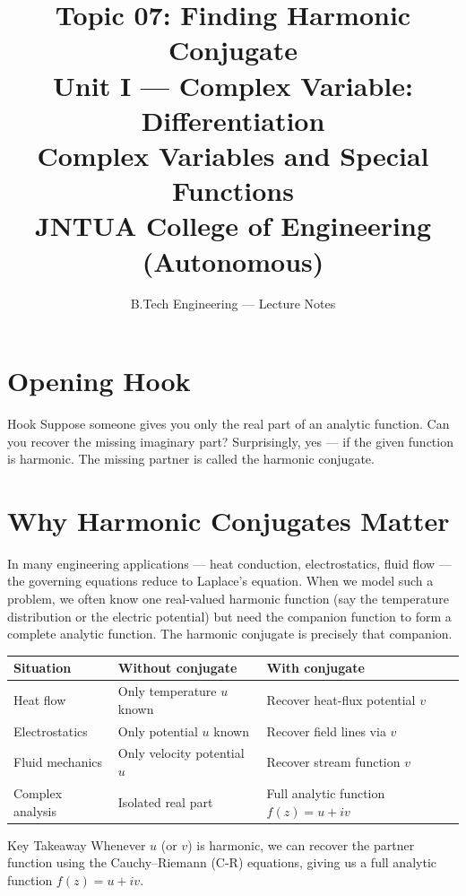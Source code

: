 \documentclass[12pt,a4paper]{article}
\title{\textbf{Topic 07: Finding Harmonic Conjugate}\\
       \large Unit I --- Complex Variable: Differentiation\\
       Complex Variables and Special Functions\\
       JNTUA College of Engineering (Autonomous)}
\author{B.Tech Engineering --- Lecture Notes}
\date{}
\begin{document}
\maketitle
\tableofcontents
\newpage

\section{Opening Hook}

\begin{curiositybox}{Hook}
Suppose someone gives you only the real part of an analytic function. Can you recover the
missing imaginary part? Surprisingly, yes --- if the given function is harmonic. The missing
partner is called the harmonic conjugate.
\end{curiositybox}

\section{Why Harmonic Conjugates Matter}

In many engineering applications --- heat conduction, electrostatics, fluid flow --- the
governing equations reduce to Laplace's equation. When we model such a problem, we often
know one real-valued harmonic function (say the temperature distribution or the electric
potential) but need the companion function to form a complete analytic function. The harmonic
conjugate is precisely that companion.

\begin{center}
\begin{tabular}{@{}lll@{}}
\toprule
\textbf{Situation} & \textbf{Without conjugate} & \textbf{With conjugate} \\
\midrule
Heat flow & Only temperature $u$ known & Recover heat-flux potential $v$ \\
Electrostatics & Only potential $u$ known & Recover field lines via $v$ \\
Fluid mechanics & Only velocity potential $u$ & Recover stream function $v$ \\
Complex analysis & Isolated real part & Full analytic function $f(z)=u+iv$ \\
\bottomrule
\end{tabular}
\end{center}

\begin{learnbox}{Key Takeaway}
Whenever $u$ (or $v$) is harmonic, we can recover the partner function using the
Cauchy--Riemann (C-R) equations, giving us a full analytic function $f(z)=u+iv$.
\end{learnbox}
\end{document}
